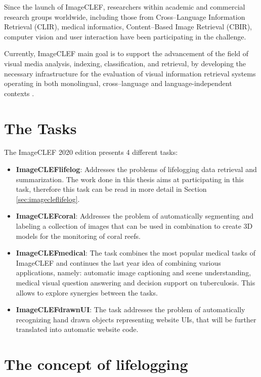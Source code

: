 Since the launch of ImageCLEF, researchers within academic and commercial research groups worldwide, including those from Cross–Language Information Retrieval (CLIR), medical informatics, Content–Based Image Retrieval (CBIR), computer vision and user interaction have been participating in the challenge. 

Currently, ImageCLEF main goal is to support the advancement of the field of visual media analysis, indexing, classification, and retrieval, by developing the necessary infrastructure for the evaluation of visual information retrieval systems operating in both monolingual, cross–language and language-independent contexts \cite{Zhang2008}. 


\newpage
\section{The Tasks}
\label{sec:tasks}

The ImageCLEF 2020 edition presents 4 different tasks:
    \begin{itemize}
    \item \textbf{ImageCLEFlifelog}: Addresses the problems of lifelogging data retrieval and summarization. The work done in this thesis aims at participating in this task, therefore this task can be read in more detail in Section \ref{sec:imagecleflifelog}.
    
    \item \textbf{ImageCLEFcoral}: Addresses the problem of automatically segmenting and labeling a collection of images that can be used in combination to create 3D models for the monitoring of coral reefs.
    
    \item \textbf{ImageCLEFmedical}: The task combines the most popular medical tasks of ImageCLEF and continues the last year idea of combining various applications, namely: automatic image captioning and scene understanding, medical visual question answering and decision support on tuberculosis. This allows to explore synergies between the tasks.
    
    \item \textbf{ImageCLEFdrawnUI}: The task addresses the problem of automatically recognizing hand drawn objects representing website UIs, that will be further translated into automatic website code.
    \end{itemize}


\section{The concept of lifelogging}
\label{sec:concept_lifelog}

